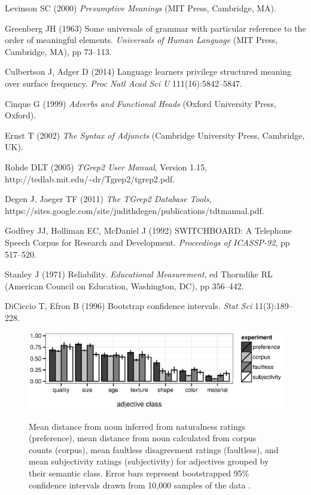 \documentclass{pnastwo}
\begin{document}
\begin{article}
\begin{thebibliography}{10}
	Levinson SC (2000) \emph{Presumptive Meanings} (MIT Press, Cambridge, MA).

	Greenberg JH (1963) Some universals of grammar with particular reference to the order of meaningful elements. \emph{Universals of Human Language} (MIT Press, Cambridge, MA), pp 73--113.
	
	Culbertson J, Adger D (2014) Language learners privilege structured meaning over surface frequency. \emph{Proc Natl Acad Sci U} 111(16):5842--5847.
	
	Cinque G (1999) \emph{Adverbs and Functional Heads} (Oxford University Press, Oxford).
	
	Ernst T (2002) \emph{The Syntax of Adjuncts} (Cambridge University Press, Cambridge, UK).
	
	Rohde DLT (2005) \emph{TGrep2 User Manual}, Version 1.15,\\ http://tedlab.mit.edu/\textasciitilde dr/Tgrep2/tgrep2.pdf.
	
	Degen J, Jaeger TF (2011) \emph{The TGrep2 Database Tools},\\ https://sites.google.com/site/judithdegen/publications/tdt\textunderscore manual.pdf.
	
	Godfrey JJ, Holliman EC, McDaniel J (1992) SWITCHBOARD: A Telephone Speech Corpus for Research and Development. \emph{Proceedings of ICASSP-92},
	pp 517--520.
	
	Stanley J (1971) Reliability. \emph{Educational Measurement}, ed Thorndike RL (American Council on Education, Washington, DC), pp 356--442.	
	
	DiCiccio T, Efron B (1996) Bootstrap confidence intervals. \emph{Stat Sci} 11(3):189--228.
	
\end{thebibliography}


\end{article}

\begin{figure}
	\centering
	{\includegraphics[width=.75\linewidth]{plots/expt_results-new.eps}}\par
	\caption{Mean distance from noun inferred from naturalness ratings (preference), mean distance from noun calculated from corpus counts (corpus),  mean faultless disagreement ratings (faultless), and mean subjectivity ratings (subjectivity) for adjectives grouped by their semantic class. Error bars represent bootstrapped 95\% confidence intervals drawn from 10,000 samples of the data \cite{diciccioefron1996}.}\label{results}
\end{figure}
\end{document}
